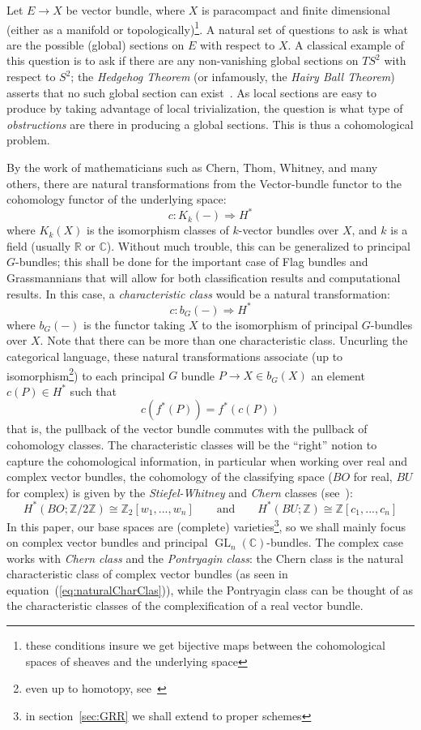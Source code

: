 \documentclass{book}
\newcommand{\C}{{\mathbb{C}}}
\newcommand{\R}{{\mathbb{R}}}
\newcommand{\Z}{{\mathbb{Z}}}
\newcommand{\GL}{{\operatorname{GL}}}
\newcommand{\Rw}{\Rightarrow}
\begin{document}
Let $E \to X$ be vector bundle, where $X$ is paracompact and finite dimensional (either as a manifold or
topologically)\footnote{these conditions insure we get bijective maps between the cohomological spaces of
sheaves and the underlying space}. A natural set of questions to ask is what are the possible (global)
sections on $E$ with respect to $X$. A classical example of this question is to ask if there are any
non-vanishing global sections on $TS^2$ with respect to $S^2$; the \emph{Hedgehog Theorem} (or infamously, the
\emph{Hairy Ball Theorem}) asserts that
no such global section can exist~\cite{NateAlgTop}. As local sections are easy to produce by taking advantage
of local trivialization, the question is what type of \emph{obstructions} are there in producing a global
sections. This is thus a cohomological problem.

By the work of mathematicians such as Chern, Thom, Whitney, and many others, there are natural transformations
from the Vector-bundle functor to the cohomology functor of the underlying space:
\[
  c: K_k(-) \Rw H^*
\]
where $K_k(X)$ is the isomorphism classes of $k$-vector bundles over $X$, and $k$ is a field (usually $\R$
or $\C$). Without much trouble, this can be generalized to principal $G$-bundles; this shall be done for the
important case of Flag bundles and Grassmannians that will allow for both classification results and
computational results. In this case, a \emph{characteristic class} would be a natural transformation:
\[
  c: b_G(-) \Rw H^*
\]
where $b_G(-)$ is the functor taking $X$ to the isomorphism of principal $G$-bundles over $X$. Note that there
can be more than one characteristic class. Uncurling the categorical language, these natural
transformations associate (up to isomorphism\footnote{even up to homotopy, see~\cite{NateKTheory}}) to each principal $G$ bundle $P \to X\in b_G(X)$ an element $c(P) \in H^*$ such
that
\[
  c(f^*(P)) = f^*(c(P))
\]
that is, the pullback of the vector bundle commutes with the pullback of
cohomology classes. The characteristic classes will be the ``right'' notion to capture the cohomological
information, in particular when working over real and complex vector bundles, the cohomology
of the classifying space ($BO$ for real, $BU$ for complex) is given by the \emph{Stiefel-Whitney} and \emph{Chern} classes
(see~\cite{NateKTheory}):
\begin{equation}\label{eq:naturalCharClas}
  H^*(BO; \Z/2\Z) \cong \Z_2[w_1, ..., w_n] \qquad \text{and} \qquad  H^*(BU; \Z)
  \cong \Z[c_1, ..., c_n]
\end{equation}
In this paper, our base spaces are (complete) varieties\footnote{in section~\ref{sec:GRR} we shall extend to
proper schemes}, so we shall mainly focus on complex vector bundles and principal
$\GL_n(\C)$-bundles. The complex case works with \emph{Chern class} and the \emph{Pontryagin class}: the Chern class
is the natural characteristic class of complex vector bundles (as seen in
equation~(\ref{eq:naturalCharClas})), while the Pontryagin class can be thought of as the characteristic
classes of the complexification of a real vector bundle.
\end{document}
